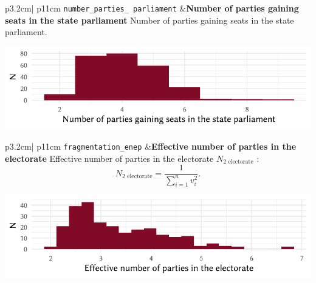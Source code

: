\documentclass[
]{scrartcl}
\begin{document}
\begin{longtable}{p{3.2cm}| p{11cm}}
\texttt{number\_parties\_
parliament} &\textbf{Number of parties gaining seats in the state parliament}\newline 
Number of parties gaining seats in the state parliament.



\hspace*{.25cm}
\begin{minipage}[t]{\linewidth }
\vspace{0pt}
\includegraphics[width = \linewidth]{cbfiles/npartiesparlplot.pdf}
\end{minipage}



\end{longtable}

\begin{longtable}{p{3.2cm}| p{11cm}}
\texttt{fragmentation\_enep} &\textbf{Effective number of parties in the electorate}\newline 
Effective number of parties in the electorate $N_{2 \text{ electorate}}$ \parencite{laaksoEffectiveNumberParties1979}:
           \begin{equation}N_{2 \text{ electorate}} = \frac{1}{\sum_{i = 1}^{n}v_{i}^{2}}. \end{equation}



\hspace*{.25cm}
\begin{minipage}[t]{\linewidth }
\vspace{0pt}
\includegraphics[width = \linewidth]{cbfiles/enepplot.pdf}
\end{minipage}



\end{longtable}
\end{document}
